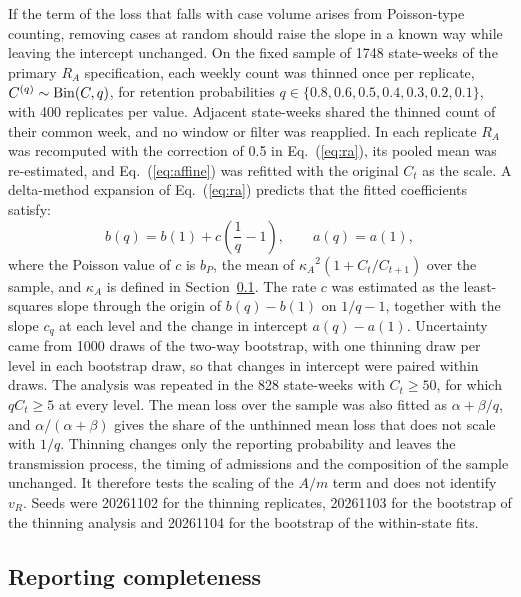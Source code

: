 If the term of the loss that falls with case volume arises from Poisson-type counting, removing cases at random should raise the slope in a known way while leaving the intercept unchanged. On the fixed sample of 1748 state-weeks of the primary $R_A$ specification, each weekly count was thinned once per replicate, $C^{(q)}\sim\mathrm{Bin}(C,q)$, for retention probabilities $q\in\{0.8,0.6,0.5,0.4,0.3,0.2,0.1\}$, with 400 replicates per value. Adjacent state-weeks shared the thinned count of their common week, and no window or filter was reapplied. In each replicate $R_A$ was recomputed with the correction of 0.5 in Eq.~(\ref{eq:ra}), its pooled mean was re-estimated, and Eq.~(\ref{eq:affine}) was refitted with the original $C_t$ as the scale. A delta-method expansion of Eq.~(\ref{eq:ra}) predicts that the fitted coefficients satisfy:
\begin{equation}
  b(q)=b(1)+c\left(\frac{1}{q}-1\right),\qquad a(q)=a(1),
  \label{eq:thinning}
\end{equation}
where the Poisson value of $c$ is $b_P$, the mean of $\kappa_A{}^2(1+C_t/C_{t+1})$ over the sample, and $\kappa_A$ is defined in Section~\ref{sec:meth-reporting}. The rate $c$ was estimated as the least-squares slope through the origin of $b(q)-b(1)$ on $1/q-1$, together with the slope $c_q$ at each level and the change in intercept $a(q)-a(1)$. Uncertainty came from 1000 draws of the two-way bootstrap, with one thinning draw per level in each bootstrap draw, so that changes in intercept were paired within draws. The analysis was repeated in the 828 state-weeks with $C_t\ge50$, for which $qC_t\ge5$ at every level. The mean loss over the sample was also fitted as $\alpha+\beta/q$, and $\alpha/(\alpha+\beta)$ gives the share of the unthinned mean loss that does not scale with $1/q$. Thinning changes only the reporting probability and leaves the transmission process, the timing of admissions and the composition of the sample unchanged. It therefore tests the scaling of the $A/m$ term and does not identify $v_R$. Seeds were 20261102 for the thinning replicates, 20261103 for the bootstrap of the thinning analysis and 20261104 for the bootstrap of the within-state fits.

\subsection{Reporting completeness}
\label{sec:meth-reporting}

